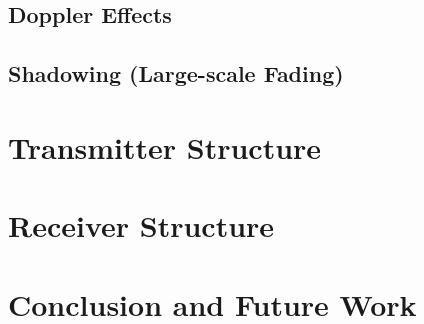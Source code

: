 \documentclass[conference]{IEEEtran}
\begin{document}
\subsection*{Doppler Effects}

\subsection*{Shadowing (Large-scale Fading)}

\section{Transmitter Structure}
\label{sec:tx}

\section{Receiver Structure}
\label{sec:rx}

\section{Conclusion and Future Work}
\label{sec:conc}
\end{document}
